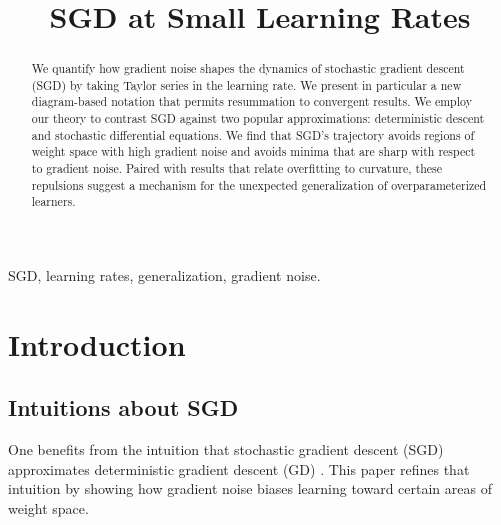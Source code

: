 \documentclass[final,12pt]{colt2021} %
\title[SGD at Small Learning Rates]{SGD at Small Learning Rates}
\begin{document}
    \maketitle
    
    \begin{abstract}%
        We quantify how gradient noise shapes the dynamics of stochastic
        gradient descent (SGD) by taking Taylor series in the learning rate.
        We present in particular a new diagram-based notation that permits
        resummation to convergent results.
        We employ our theory to contrast SGD against two popular
        approximations: deterministic descent and stochastic differential
        equations.  We find that SGD's trajectory avoids regions of weight
        space with high gradient noise and avoids minima that are sharp with
        respect to gradient noise.  Paired with results that relate overfitting
        to curvature, these repulsions suggest a mechanism for the unexpected
        generalization of overparameterized learners.
    \end{abstract}
    
    \begin{keywords}%
        SGD, learning rates, generalization, gradient noise. 
    \end{keywords}

    \section{Introduction}

        \subsection{Intuitions about SGD}

            One benefits from the intuition that stochastic gradient descent
            (SGD) approximates deterministic gradient descent (GD)
            \citep{bo91}.  This paper refines that intuition by showing how
            gradient noise biases learning toward certain areas of weight
            space.
\end{document}
